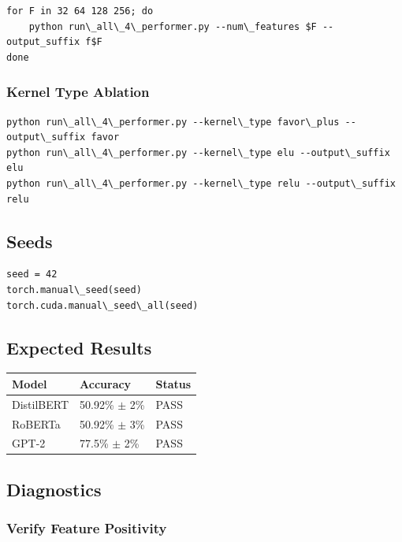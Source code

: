 \begin{lstlisting}
for F in 32 64 128 256; do
    python run\_all\_4\_performer.py --num\_features $F --output_suffix f$F
done
\end{lstlisting}

\subsubsection{Kernel Type Ablation}

\begin{lstlisting}
python run\_all\_4\_performer.py --kernel\_type favor\_plus --output\_suffix favor
python run\_all\_4\_performer.py --kernel\_type elu --output\_suffix elu
python run\_all\_4\_performer.py --kernel\_type relu --output\_suffix relu
\end{lstlisting}

\subsection{Seeds}

\begin{lstlisting}
seed = 42
torch.manual\_seed(seed)
torch.cuda.manual\_seed\_all(seed)
\end{lstlisting}

\subsection{Expected Results}

\begin{table}[H]
\centering
\small
\begin{tabular}{lll}
\toprule
\textbf{Model} & \textbf{Accuracy} & \textbf{Status} \\
\midrule
DistilBERT & 50.92\% $\pm$ 2\% & PASS \\
RoBERTa & 50.92\% $\pm$ 3\% & PASS \\
GPT-2 & 77.5\% $\pm$ 2\% & PASS \\
\bottomrule
\end{tabular}
\end{table}

\subsection{Diagnostics}

\subsubsection{Verify Feature Positivity}

